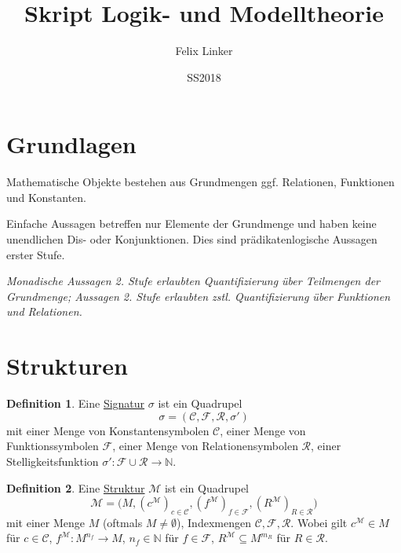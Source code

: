 \documentclass{article}
\title{Skript Logik- und Modelltheorie}
\author{Felix Linker}
\date{SS2018}
\theoremstyle{definition}
\newtheorem{dfn}{Definition}
\newcommand{\calC}{\mathcal{C}}
\newcommand{\calF}{\mathcal{F}}
\newcommand{\calM}{\mathcal{M}}
\newcommand{\calR}{\mathcal{R}}
\begin{document}
    \maketitle

    \section*{Grundlagen}

    Mathematische Objekte bestehen aus Grundmengen ggf. Relationen, Funktionen und Konstanten.

    Einfache Aussagen betreffen nur Elemente der Grundmenge und haben keine unendlichen Dis- oder Konjunktionen.
    Dies sind prädikatenlogische Aussagen erster Stufe.

    \textit{Monadische Aussagen 2. Stufe erlaubten Quantifizierung über Teilmengen der Grundmenge; Aussagen 2. Stufe erlaubten zstl. Quantifizierung über Funktionen und Relationen.}

    \section{Strukturen}

    \begin{dfn}
        Eine \underline{Signatur} $ \sigma $ ist ein Quadrupel
        \begin{equation}
            \sigma = (\calC, \calF, \calR, \sigma')
        \end{equation}
        mit einer Menge von Konstantensymbolen $ \calC $, einer Menge von Funktionssymbolen $ \calF $, einer Menge von Relationensymbolen $ \calR $, einer Stelligkeitsfunktion $ \sigma' : \calF \cup \calR \rightarrow \mathbb{N} $.
    \end{dfn}

    \begin{dfn}
        Eine \underline{Struktur} $ \calM $ ist ein Quadrupel
        \begin{equation}
            \calM = \big(M, (c^\calM)_{c \in \calC}, (f^\calM)_{f \in \calF}, (R^\calM)_{R \in \calR}\big)
        \end{equation}
        mit einer Menge $ M $ (oftmals $ M \neq \emptyset $), Indexmengen $ \calC, \calF, \calR $.
        Wobei gilt $ c^\calM \in M $ für $ c \in \calC $, $ f^\calM : M^{n_f} \rightarrow M $, $ n_f \in \mathbb{N} $ für $ f \in \calF $, $ R^\calM \subseteq M^{m_R} $ für $ R \in \calR $.
    \end{dfn}
\end{document}
